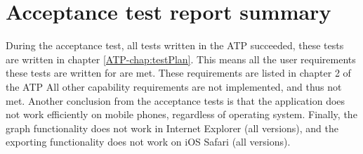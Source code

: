 \chapter{Acceptance test report summary}
\label{chap:testreports}

During the acceptance test, all tests written in the ATP \cite{atp} succeeded, these tests are written in chapter \ref*{ATP-chap:testPlan}. This means all the user requirements these tests are written for are met. These requirements are listed in chapter 2 of the ATP \cite{atp} All other capability requirements are not implemented, and thus not met. Another conclusion from the acceptance tests is that the application does not work efficiently on mobile phones, regardless of operating system. Finally, the graph functionality does not work in Internet Explorer (all versions), and the exporting functionality does not work on iOS Safari (all versions).
